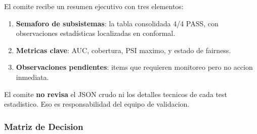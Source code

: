 \documentclass[
  spanish,
  11pt,
  letterpaper,
]{scrbook}
\providecommand{\tightlist}{%
  \setlength{\itemsep}{0pt}\setlength{\parskip}{0pt}}
\theoremstyle{plain}
\theoremstyle{remark}
\begin{document}
El comite recibe un resumen ejecutivo con tres elementos:

\begin{enumerate}
\def\labelenumi{\arabic{enumi}.}
\tightlist
\item
  \textbf{Semaforo de subsistemas}: la tabla consolidada 4/4 PASS, con
  observaciones estadísticas localizadas en conformal.
\item
  \textbf{Metricas clave}: AUC, cobertura, PSI maximo, y estado de
  fairness.
\item
  \textbf{Observaciones pendientes}: items que requieren monitoreo pero
  no accion inmediata.
\end{enumerate}

El comite \textbf{no revisa} el JSON crudo ni los detalles tecnicos de
cada test estadistico. Eso es responsabilidad del equipo de validacion.

\subsubsection{Matriz de Decision}\label{matriz-de-decision}
\end{document}
